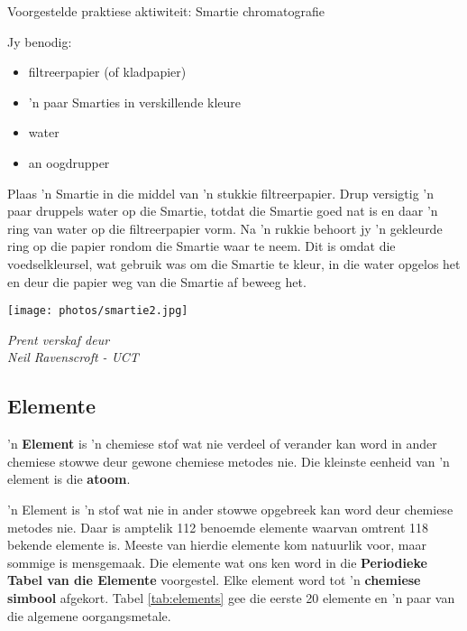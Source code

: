 \begin{activity}{Voorgestelde praktiese aktiwiteit: Smartie chromatografie}{
Jy benodig:
\begin{itemize}[noitemsep]
\item filtreerpapier (of kladpapier)
\item 'n paar Smarties in verskillende kleure
\item water
\item an oogdrupper
\end{itemize}
\begin{minipage}{.5\textwidth}
Plaas 'n Smartie in die middel van 'n stukkie filtreerpapier. Drup versigtig 'n paar druppels water op die Smartie, totdat die Smartie goed nat is en daar 'n ring van water op die filtreerpapier vorm. Na 'n rukkie behoort jy 'n gekleurde ring op die papier rondom die Smartie waar te neem. Dit is omdat die voedselkleursel, wat gebruik was om die Smartie te kleur, in die water opgelos het en deur die papier weg van die Smartie af beweeg het.
\end{minipage}
\begin{minipage}{.5\textwidth}
\begin{center}
 \texttt{[image: photos/smartie2.jpg]}\par
\textit{Prent verskaf deur\\ Neil Ravenscroft - UCT}
\end{center}
\end{minipage}
}
\end{activity}
\par 
	\par
      \label{m38708*uid25}
            \subsection*{Elemente}
            \nopagebreak
        \label{m38708*id63302} 'n \textbf{Element} is 'n chemiese stof wat nie verdeel of verander kan word in ander chemiese stowwe deur gewone chemiese metodes nie. Die kleinste eenheid van 'n element is die \textbf{atoom}.\par 

\label{m38708*fhsst!!!underscore!!!id193}
{ \label{m38708*meaningfhsst!!!underscore!!!id193}
 'n Element is 'n stof wat nie in ander stowwe opgebreek kan word deur chemiese metodes nie.} 
        \label{m38708*id63334}Daar is amptelik 112 benoemde elemente waarvan omtrent 118 bekende elemente is. Meeste van hierdie elemente kom natuurlik voor, maar sommige is mensgemaak. Die elemente wat ons ken word in die \textbf{Periodieke Tabel van die Elemente} voorgestel. Elke element word tot 'n \textbf{chemiese simbool} afgekort. Tabel \ref{tab:elements} gee die eerste 20 elemente en 'n paar van die algemene oorgangsmetale.\par \label{m38708*eip-775}

